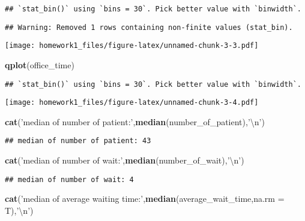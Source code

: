\documentclass[]{article}
\newenvironment{Shaded}{\begin{snugshade}}{\end{snugshade}}
\newcommand{\KeywordTok}[1]{\textcolor[rgb]{0.13,0.29,0.53}{\textbf{#1}}}
\newcommand{\DataTypeTok}[1]{\textcolor[rgb]{0.13,0.29,0.53}{#1}}
\newcommand{\CharTok}[1]{\textcolor[rgb]{0.31,0.60,0.02}{#1}}
\newcommand{\StringTok}[1]{\textcolor[rgb]{0.31,0.60,0.02}{#1}}
\newcommand{\NormalTok}[1]{#1}
\begin{document}
\begin{verbatim}
## `stat_bin()` using `bins = 30`. Pick better value with `binwidth`.
\end{verbatim}

\begin{verbatim}
## Warning: Removed 1 rows containing non-finite values (stat_bin).
\end{verbatim}

\texttt{[image: homework1\_files/figure-latex/unnamed-chunk-3-3.pdf]}

\begin{Shaded}
\begin{Highlighting}[]
\KeywordTok{qplot}\NormalTok{(office_time)}
\end{Highlighting}
\end{Shaded}

\begin{verbatim}
## `stat_bin()` using `bins = 30`. Pick better value with `binwidth`.
\end{verbatim}

\texttt{[image: homework1\_files/figure-latex/unnamed-chunk-3-4.pdf]}

\begin{Shaded}
\begin{Highlighting}[]
\KeywordTok{cat}\NormalTok{(}\StringTok{'median of number of patient:'}\NormalTok{,}\KeywordTok{median}\NormalTok{(number_of_patient),}\StringTok{'}\CharTok{\textbackslash{}n}\StringTok{'}\NormalTok{)}
\end{Highlighting}
\end{Shaded}

\begin{verbatim}
## median of number of patient: 43
\end{verbatim}

\begin{Shaded}
\begin{Highlighting}[]
\KeywordTok{cat}\NormalTok{(}\StringTok{'median of number of wait:'}\NormalTok{,}\KeywordTok{median}\NormalTok{(number_of_wait),}\StringTok{'}\CharTok{\textbackslash{}n}\StringTok{'}\NormalTok{)}
\end{Highlighting}
\end{Shaded}

\begin{verbatim}
## median of number of wait: 4
\end{verbatim}

\begin{Shaded}
\begin{Highlighting}[]
\KeywordTok{cat}\NormalTok{(}\StringTok{'median of average waiting time:'}\NormalTok{,}\KeywordTok{median}\NormalTok{(average_wait_time,}\DataTypeTok{na.rm =}\NormalTok{ T),}\StringTok{'}\CharTok{\textbackslash{}n}\StringTok{'}\NormalTok{)}
\end{Highlighting}
\end{Shaded}
\end{document}
